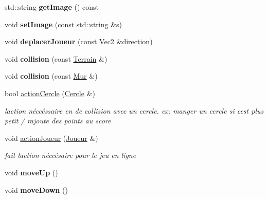 \begin{DoxyCompactItemize}
std\+::string {\bfseries get\+Image} () const
\item 
\mbox{\label{class_joueur_a2bd7f1da6201533e9e4fe4135e9c3097}} 
void {\bfseries set\+Image} (const std\+::string \&s)
\item 
\mbox{\label{class_joueur_a9e008b9bdf18b2196706da207b40bea2}} 
void {\bfseries deplacer\+Joueur} (const Vec2 \&direction)
\item 
\mbox{\label{class_joueur_a30eba806864163e92d2f884f21d9ad35}} 
void {\bfseries collision} (const \mbox{\hyperlink{class_terrain}{Terrain}} \&)
\item 
\mbox{\label{class_joueur_a0169afba32e10d103d535e2fcc577736}} 
void {\bfseries collision} (const \mbox{\hyperlink{class_mur}{Mur}} \&)
\item 
\mbox{\label{class_joueur_aa43300b65ed3d7254b0d1afabf5b8ce3}} 
bool \mbox{\hyperlink{class_joueur_aa43300b65ed3d7254b0d1afabf5b8ce3}{action\+Cercle}} (\mbox{\hyperlink{class_cercle}{Cercle}} \&)
\begin{DoxyCompactList}\small\item\em l\textquotesingle{}action néccéssaire en de collision avec un cercle. ex\+: manger un cercle si c\textquotesingle{}est plus petit / rajoute des points au score \end{DoxyCompactList}\item 
\mbox{\label{class_joueur_a00d886b1357bfb274384ec99ecc24fd3}} 
void \mbox{\hyperlink{class_joueur_a00d886b1357bfb274384ec99ecc24fd3}{action\+Joueur}} (\mbox{\hyperlink{class_joueur}{Joueur}} \&)
\begin{DoxyCompactList}\small\item\em fait l\textquotesingle{}action néccésaire pour le jeu en ligne \end{DoxyCompactList}\item 
\mbox{\label{class_joueur_a9aecf01977c68758ec2853de174d17e2}} 
void {\bfseries move\+Up} ()
\item 
\mbox{\label{class_joueur_a5b8219a69012fcefeaa0662d4003ae5f}} 
void {\bfseries move\+Down} ()
\item 

\end{DoxyCompactItemize}
